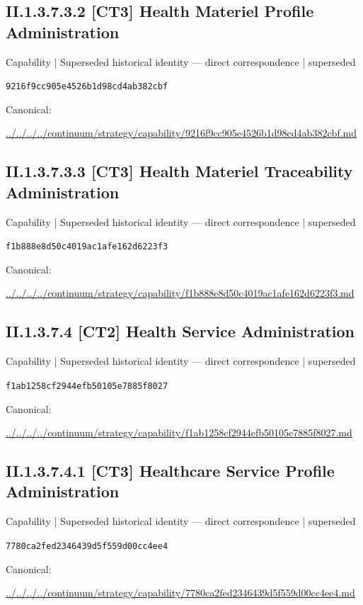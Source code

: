 \documentclass[10pt,a4paper]{article}
\begin{document}
\subsection*{II.1.3.7.3.2 [CT3] Health Materiel Profile Administration}
{\small Capability | Superseded historical identity — direct correspondence | superseded}\par
\texttt{9216f9cc905e4526b1d98cd4ab382cbf}\par
Canonical: \par
{\footnotesize\url{../../../../continuum/strategy/capability/9216f9cc905e4526b1d98cd4ab382cbf.md}}\par
\subsection*{II.1.3.7.3.3 [CT3] Health Materiel Traceability Administration}
{\small Capability | Superseded historical identity — direct correspondence | superseded}\par
\texttt{f1b888e8d50c4019ac1afe162d6223f3}\par
Canonical: \par
{\footnotesize\url{../../../../continuum/strategy/capability/f1b888e8d50c4019ac1afe162d6223f3.md}}\par
\subsection*{II.1.3.7.4 [CT2] Health Service Administration}
{\small Capability | Superseded historical identity — direct correspondence | superseded}\par
\texttt{f1ab1258cf2944efb50105e7885f8027}\par
Canonical: \par
{\footnotesize\url{../../../../continuum/strategy/capability/f1ab1258cf2944efb50105e7885f8027.md}}\par
\subsection*{II.1.3.7.4.1 [CT3] Healthcare Service Profile Administration}
{\small Capability | Superseded historical identity — direct correspondence | superseded}\par
\texttt{7780ca2fed2346439d5f559d00cc4ee4}\par
Canonical: \par
{\footnotesize\url{../../../../continuum/strategy/capability/7780ca2fed2346439d5f559d00cc4ee4.md}}\par
\end{document}
